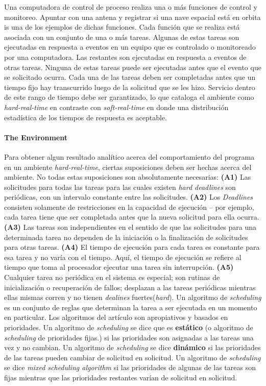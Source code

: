 Una computadora de control de proceso realiza una o más funciones de control y monitoreo. Apuntar con una antena y registrar si una nave espacial está en orbita is una de los ejemplos de dichas funciones. Cada función que se realiza está asociada con un conjunto de una o más tareas. Algunas de estas tareas son ejecutadas en respuesta a eventos en un equipo que es controlado o monitoreado por una computadora. Las restantes son ejecutadas en respuesta a eventos de otras tareas. Ninguna de estas tareas puede ser ejecutadas antes que el evento que se solicitado ocurra. Cada una de las tareas deben ser completadas antes que un tiempo fijo hay transcurrido luego de la solicitud que se les hizo. Servicio dentro de este rango de tiempo debe ser garantizado, lo que cataloga el ambiente como \emph{hard-real-time} en contraste con \emph{soft-real-time} en donde una distribución estadística de los tiempos de respuesta es aceptable.

\paragraph{\textnormal{\textbf{The Environment}}} Para obtener algun resultado analítico acerca del comportamiento del programa en un ambiente \emph{hard-real-time}, ciertas suposiciones deben ser hechas acerca del ambiente. No todas estas suposiciones son absolutamente necesarias: \textbf{(A1)} Las solicitudes para todas las tareas para las cuales existen \emph{hard deadlines} son periódicas, con un intervalo constante entre las solicitudes. \textbf{(A2)} Los \emph{Deadlines} consisten solamente de restricciones en la capacidad de ejecución -- por ejemplo, cada tarea tiene que ser completada antes que la nueva solicitud para ella ocurra. \textbf{(A3)} Las tareas son independientes en el sentido de que las solicitudes para una determinada tarea no dependen de la iniciación o la finalización de solicitudes para otras tareas. \textbf{(A4)} El tiempo de ejecución para cada tarea es constante para esa tarea y no varía con el tiempo. Aquí, el tiempo de ejecución se refiere al tiempo que toma al procesador ejecutar una tarea sin interrupción. \textbf{(A5)} Cualquier tarea no periódica en el sistema es especial; son rutinas de inicialización o recuperación de fallos; desplazan a las tareas periódicas mientras ellas mismas corren y no tienen \emph{dealines} fuertes(\emph{hard}). Un algoritmo de \emph{scheduling} es un conjunto de reglas que determinan la tarea a ser ejecutada en un momento en particular. Los algoritmos del artículo son apropiativos y basados en prioridades. Un algoritmo de \emph{scheduling} se dice que es \textbf{estático} (o algoritmo de \emph{scheduling} de prioridades fijas.) si las prioridades son asignadas a las tareas una vez y no cambian. Un algoritmo de \emph{scheduling} se dice \textbf{dinámico} si las prioridades de las tareas pueden cambiar de solicitud en solicitud. Un algoritmo de \emph{scheduling} se dice \emph{mixed scheduling algorithm} si las prioridades de algunas de las tareas son fijas mientras que las prioridades restantes varían de solicitud en solicitud.

